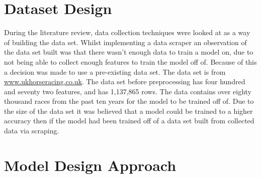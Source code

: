 \section{Dataset Design}
During the literature review, data collection techniques were looked at as a way of building the data set. Whilst implementing a data scraper an observation of the data set built was that there wasn't enough data to train a model on, due to not being able to collect enough features to train the model off of. Because of this a decision was made to use a pre-existing data set. The data set is from \url{www.ukhorseracing.co.uk}. The data set before preprocessing has four hundred and seventy two features, and has 1,137,865 rows. The data contains over eighty thousand races from the past ten years for the model to be trained off of. Due to the size of the data set it was believed that a model could be trained to a higher accuracy then if the model had been trained off of a data set built from collected data via scraping.

\section{Model Design Approach}

